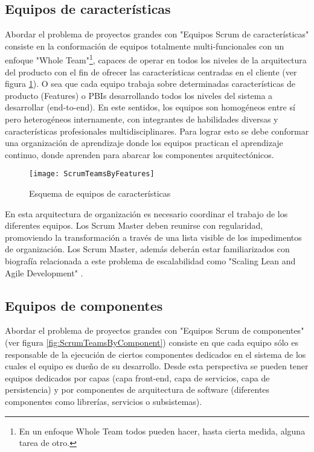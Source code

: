 \subsection{Equipos de características}

Abordar el problema de proyectos grandes con "Equipos Scrum de características" consiste en la conformación de equipos totalmente multi-funcionales con un enfoque "Whole Team"\footnote{En un enfoque Whole Team todos pueden hacer, hasta cierta medida, alguna tarea de otro\cite{Juan-Gabardini-2015}.}, capaces de operar en todos los niveles de la arquitectura del producto con el fin de ofrecer las características centradas en el cliente (ver figura \ref{fig:ScrumTeamsByFeatures}). O sea que cada equipo trabaja sobre determinadas características de producto (Features) o PBIs desarrollando todos los niveles del sistema a desarrollar (end-to-end). En este sentidos, los equipos son homogéneos entre sí pero heterogéneos internamente, con integrantes de habilidades diversas y características profesionales multidisciplinares. Para lograr esto se debe conformar una organización de aprendizaje donde los equipos practican el aprendizaje continuo, donde aprenden para abarcar los componentes arquitectónicos.

\begin{figure}[h]
  \centering
  \texttt{[image: ScrumTeamsByFeatures]}
  \caption{Esquema de equipos de características}
  \centering
  \label{fig:ScrumTeamsByFeatures} %
\end{figure}

En esta arquitectura de organización es necesario coordinar el trabajo de los diferentes equipos. Los Scrum Master deben reunirse con regularidad, promoviendo la transformación a través de una lista visible de los impedimentos de organización. Los Scrum Master, además deberán estar familiarizados con biografía relacionada a este problema de escalabilidad como "Scaling Lean and Agile Development" \cite{Larman-Vodde-2008}.

\subsection{Equipos de componentes}

Abordar el problema de proyectos grandes con "Equipos Scrum de componentes" (ver figura \ref{fig:ScrumTeamsByComponent}) consiste en que cada equipo sólo es responsable de la ejecución de ciertos componentes dedicados en el sistema de los cuales el equipo es dueño de su desarrollo. Desde esta perspectiva se pueden tener equipos dedicados por capas (capa front-end, capa de servicios, capa de persistencia) y por componentes de arquitectura de software (diferentes componentes como librerías, servicios o subsistemas).

